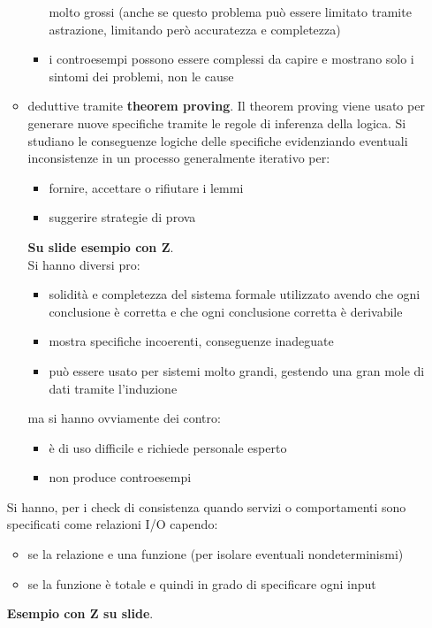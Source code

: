 \documentclass[a4paper,12pt, oneside]{book}
\begin{document}
\begin{itemize}
\begin{itemize}
\begin{itemize}
      molto grossi (anche se questo problema può essere limitato tramite
      astrazione, limitando però accuratezza e completezza)
      \item i controesempi possono essere complessi da capire e mostrano solo i
      sintomi dei problemi, non le cause
    \end{itemize}
    \item deduttive tramite \textbf{theorem proving}. Il theorem proving
    viene usato per generare nuove specifiche tramite le regole di inferenza
    della logica. Si studiano le conseguenze logiche delle specifiche
    evidenziando eventuali inconsistenze in un processo generalmente iterativo
    per:
    \begin{itemize}
      \item fornire, accettare o rifiutare i lemmi 
      \item suggerire strategie di prova
    \end{itemize}
    \textbf{Su slide esempio con Z}.\\
    Si hanno diversi pro:
    \begin{itemize}
      \item solidità e completezza del sistema formale utilizzato avendo che
      ogni conclusione è corretta e che ogni conclusione corretta è derivabile
      \item mostra specifiche incoerenti, conseguenze inadeguate
      \item può essere usato per sistemi molto grandi, gestendo una gran mole
      di dati tramite l'induzione
    \end{itemize}
    ma si hanno ovviamente dei contro:
    \begin{itemize}
      \item è di uso difficile e richiede personale esperto
      \item non produce controesempi
    \end{itemize}
  \end{itemize}
  Si hanno, per i check di consistenza quando servizi o comportamenti sono
  specificati come relazioni I/O capendo:
  \begin{itemize}
    \item se la relazione e una funzione (per isolare eventuali nondeterminismi)
    \item se la funzione è totale e quindi in grado di specificare ogni input
  \end{itemize}
  \textbf{Esempio con Z su slide}.\\
\end{itemize}
\end{document}
